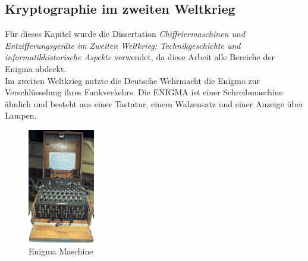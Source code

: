 \subsection{Kryptographie im zweiten Weltkrieg}
Für dieses Kapitel wurde die Dissertation \textit{Chiffriermaschinen und Entzifferungsgeräte
im Zweiten Weltkrieg: Technikgeschichte und informatikhistorische Aspekte} \cite{enigma} verwendet, da diese Arbeit alle Bereiche der Enigma abdeckt. \\
Im zweiten Weltkrieg nutzte die Deutsche Wehrmacht die Enigma zur Verschlüsselung ihres Funkverkehrs. Die ENIGMA ist einer Schreibmaschine ähnlich und besteht aus einer Tastatur, einem Walzensatz und einer Anzeige über Lampen. 
%
\begin{figure}[ht]
\begin{center}
\includegraphics[height=5cm]{images/Enigma_Verkehrshaus_Luzern_cropped.jpg}
\caption{Enigma Maschine}
\label{fig:enigma}
\end{center}
\end{figure}
%
